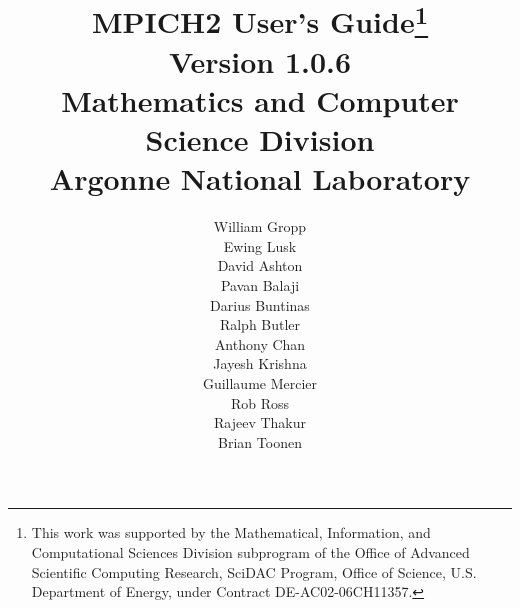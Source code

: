 \documentclass[dvipdfm,11pt]{article}
\begin{document}
\title{\textbf{MPICH2 User's Guide}\thanks{This work was supported by the Mathematical,
    Information, and Computational Sciences Division subprogram of the
    Office of Advanced Scientific Computing Research, SciDAC Program,
    Office of Science, U.S. Department of Energy, under Contract
    DE-AC02-06CH11357.}\\
Version 1.0.6\\
Mathematics and Computer Science Division\\
Argonne National Laboratory}

\author{William Gropp\\
Ewing Lusk\\
David Ashton\\
Pavan Balaji\\
Darius Buntinas\\
Ralph Butler\\
Anthony Chan\\
Jayesh Krishna\\
Guillaume Mercier\\
Rob Ross\\
Rajeev Thakur\\
Brian Toonen}

\maketitle

\cleardoublepage

\tableofcontents
\clearpage

\pagestyle{headings}


\end{document}
